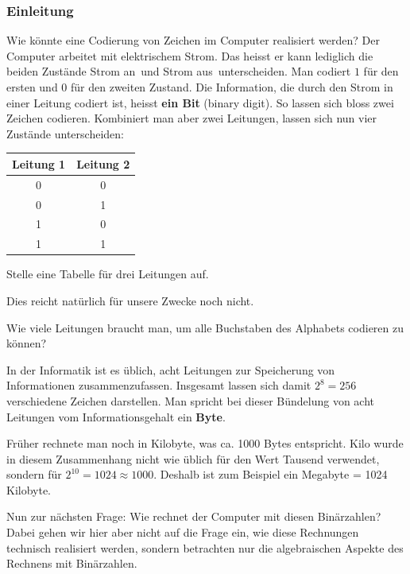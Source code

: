 \documentclass[%
11pt,%
twoside,%
titlepage,%
german,%
headsepline%
]{scrartcl}
\begin{document}
\subsubsection{Einleitung}
Wie könnte eine Codierung von Zeichen im Computer realisiert werden? Der Computer arbeitet mit elektrischem Strom. Das heisst er kann lediglich die beiden Zustände \glqq Strom an\grqq\ und \glqq Strom aus\grqq\ unterscheiden. Man codiert $1$ für den ersten und $0$ für den zweiten Zustand. Die Information, die durch den Strom in einer Leitung codiert ist, heisst \textbf{ein Bit} (binary digit). So lassen sich bloss zwei Zeichen codieren. Kombiniert man aber zwei Leitungen, lassen sich nun vier Zustände unterscheiden:
\begin{center}
\begin{tabular}{c|c}
Leitung 1 & Leitung 2\\ \hline
0 & 0\\
0 & 1\\
1 & 0\\
1 & 1\\
\end{tabular}
\begin{ueb}
Stelle eine Tabelle für drei Leitungen auf.
\end{ueb}
\end{center}
Dies reicht natürlich für unsere Zwecke noch nicht.
\begin{frage}
Wie viele Leitungen braucht man, um alle Buchstaben des Alphabets codieren zu können?
\end{frage}
In der Informatik ist es üblich, acht Leitungen zur Speicherung von Informationen zusammenzufassen. Insgesamt lassen sich damit $2^8=256$ verschiedene Zeichen darstellen. Man spricht bei dieser Bündelung von acht Leitungen vom Informationsgehalt ein \textbf{Byte}.
\begin{bem}
Früher rechnete man noch in Kilobyte, was ca. 1000 Bytes entspricht. Kilo wurde in diesem Zusammenhang nicht wie üblich für den Wert Tausend verwendet, sondern für $2^{10}=1024\approx1000$. Deshalb ist zum Beispiel ein Megabyte = 1024 Kilobyte.
\end{bem}
Nun zur nächsten Frage: Wie rechnet der Computer mit diesen Binärzahlen? Dabei gehen wir hier aber nicht auf die Frage ein, wie diese Rechnungen technisch realisiert werden, sondern betrachten nur die algebraischen Aspekte des Rechnens mit Binärzahlen.
\end{document}
